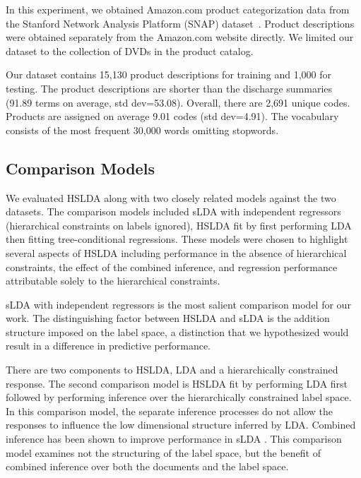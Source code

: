 In this experiment, we obtained Amazon.com product categorization data from 
the Stanford Network Analysis Platform (SNAP) dataset~\citep{SNAP}. 
Product descriptions were obtained separately from the
Amazon.com website directly. We limited our dataset to the collection of DVDs
in the product catalog.


Our dataset contains 15,130 product descriptions for training and 1,000
for testing. The product descriptions are shorter than the discharge summaries
(91.89 terms on average, std dev=53.08). Overall, there are 2,691 unique codes.
Products are assigned on average 9.01 codes (std dev=4.91). The vocabulary
consists of the most frequent 30,000 words omitting stopwords. 

\subsection{Comparison Models}

We evaluated HSLDA along with two closely related models against
the two datasets. The comparison models included sLDA with independent
regressors (hierarchical constraints on labels ignored), HSLDA fit by first
performing LDA then fitting tree-conditional regressions. These models were
chosen to  highlight several aspects of HSLDA including performance in the
absence  of hierarchical constraints, the effect of the combined inference, and
regression performance attributable solely to the hierarchical constraints.

sLDA with independent regressors is the most salient comparison model
for our work. The distinguishing factor between HSLDA and sLDA is the
addition structure imposed on the label space, a distinction that we
hypothesized would result in a difference in predictive performance. 

There are two components to HSLDA, LDA and a hierarchically constrained
response. The second comparison model is HSLDA fit by performing LDA first
followed by performing inference over the hierarchically constrained label
space. In this comparison model, the separate inference processes do not allow
the responses to influence the low dimensional structure inferred by LDA.
Combined inference has been shown to improve performance in sLDA
\citep{BleiMcAuliffe2008}. This comparison model examines not the structuring
of the label space, but the benefit of combined inference over both the
documents and the label space. 

